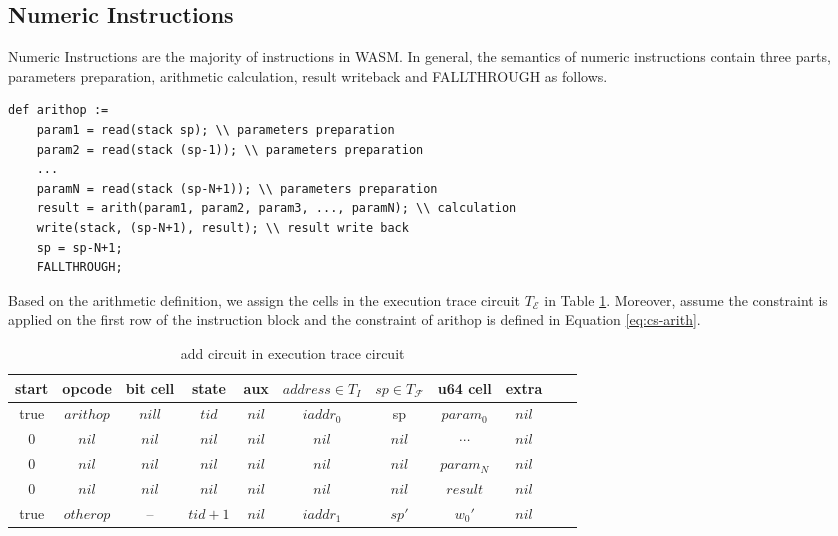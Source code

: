 \subsection{Numeric Instructions}
\label{chp:numeric-instruction}
Numeric Instructions are the majority of instructions in WASM. In general, the semantics of numeric instructions contain three parts, parameters preparation, arithmetic calculation, result writeback and FALLTHROUGH as follows.
\begin{verbatim}
def arithop :=
    param1 = read(stack sp); \\ parameters preparation
    param2 = read(stack (sp-1)); \\ parameters preparation
    ...
    paramN = read(stack (sp-N+1)); \\ parameters preparation
    result = arith(param1, param2, param3, ..., paramN); \\ calculation
    write(stack, (sp-N+1), result); \\ result write back
    sp = sp-N+1;
    FALLTHROUGH;
\end{verbatim}
Based on the arithmetic definition, we assign the cells in the execution trace circuit $T_\mathcal{E}$ in Table \ref{tbl:arith-instruction}. Moreover, assume the constraint is applied on the first row of the instruction block and the constraint of arithop is defined in Equation \ref{eq:cs-arith}.
\begin{table}[!h]
\begin{center}
\begin{tabular}{ | c | c | c | c | c | c | c | c | c | c | c | }
  \hline
  start & opcode & bit cell & state & aux & $address \in T_{I}$ & $sp \in T_\mathcal{F}$& u64 cell & extra \\ 
  \hline
   true & $arithop$ & $nill$ & $tid$ & $nil$ & $iaddr_0$ & sp & $param_0$ & $nil$\\ 
 \hline
   0 & $nil$ & $nil$ & $nil$ & $nil$ & $nil$ & $nil$ & $\cdots$ & $nil$\\ 
 \hline
   0 & $nil$ & $nil$ & $nil$ & $nil$ & $nil$ & $nil$ & $param_N$ & $nil$\\ 
 \hline
   0 & $nil$ & $nil$ & $nil$ & $nil$ & $nil$ & $nil$ & $result$ & $nil$\\ 
 \hline
    true & $otherop$ & -- & $tid+1$ & $nil$ & $iaddr_1$ & $sp'$ & $w_0'$ & $nil$\\
 \hline
\end{tabular}
\caption{add circuit in execution trace circuit}
\label{tbl:arith-instruction}
\end{center}
\end{table}
